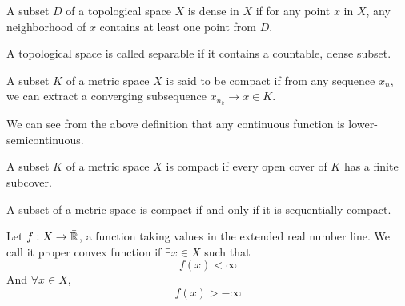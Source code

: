 \begin{definition}
	A subset $D$ of a topological space $X$ is dense in $X$ if for any point $x$ in $X$, any neighborhood of $x$ contains at least one point from $D$.
\end{definition}

\begin{definition}
	A topological space is called separable if it contains a countable, dense subset.
\end{definition}

\begin{definition}

\end{definition}

\begin{definition}
\end{definition}



\begin{definition}
	A subset $K$ of a metric space $X$ is said to be compact if from any sequence $x_n$, we can extract a converging subsequence $x_{n_k} \rightarrow x \in K$.
\end{definition}
We can see from the above definition that any continuous function is lower-semicontinuous. 

\begin{definition}[Compactness]
		A subset $K$ of a metric space $X$ is compact if every open cover of $K$ has a finite subcover. 
\end{definition}

\begin{theorem}
	A subset of a metric space is compact if and only if it is sequentially compact.
\end{theorem}



\begin{definition}
\end{definition}


\begin{definition}
\end{definition}

\begin{definition}
	Let $f: X\rightarrow\bar{\mathbb{R}}$, a function taking values in the extended real number line. We call it proper convex function if $\exists x \in X$ such that 
	\begin{equation*}
	f(x)<\infty
	\end{equation*}
	And $\forall x \in X$,
	\begin{equation}
	f(x)>-\infty
	\end{equation}
\end{definition}


